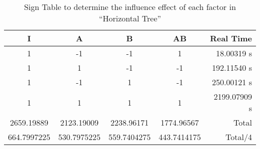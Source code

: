 \begin{table}[h]
	\caption{Sign Table to determine the influence effect of each factor in ``Horizontal Tree''}
	\center
	\begin{tabular}{ c c c c r }
		\hline
		I & A & B & AB & Real Time \\
		\hline
		1 & -1 & -1 &  1 &   18.00319 s \\
		1 &  1 & -1 & -1 &  192.11540 s \\
		1 & -1 &  1 & -1 &  250.00121 s \\
		1 &  1 &  1 &  1 & 2199.07909 s \\
		\hline
		2659.19889 & 2123.19009 & 2238.96171 & 1774.96567 & Total \\
		664.7997225 & 530.7975225& 559.7404275 & 443.7414175 & Total/4 \\
		\hline
	\end{tabular}
\end{table}